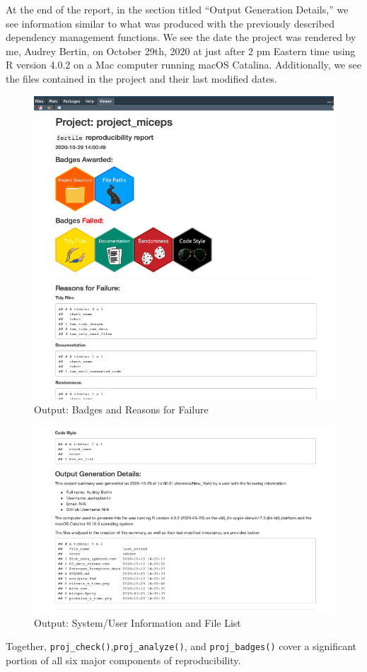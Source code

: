 \documentclass[12pt,twoside]{reedthesis}
\begin{document}
At the end of the report, in the section titled ``Output Generation Details,'' we see information similar to what was produced with the previously described dependency management functions. We see the date the project was rendered by me, Audrey Bertin, on October 29th, 2020 at just after 2 pm Eastern time using R version 4.0.2 on a Mac computer running macOS Catalina. Additionally, we see the files contained in the project and their last modified dates.
\begin{figure}
\includegraphics[width=1\linewidth]{figure/badges-1} \caption{Output: Badges and Reasons for Failure}\label{fig:badges-1}
\end{figure}
\begin{figure}
\includegraphics[width=1\linewidth]{figure/badges-2} \caption{Output: System/User Information and File List}\label{fig:badges-2}
\end{figure}
Together, \texttt{proj\_check()},\texttt{proj\_analyze()}, and \texttt{proj\_badges()} cover a significant portion of all six major components of reproducibility.
\end{document}
